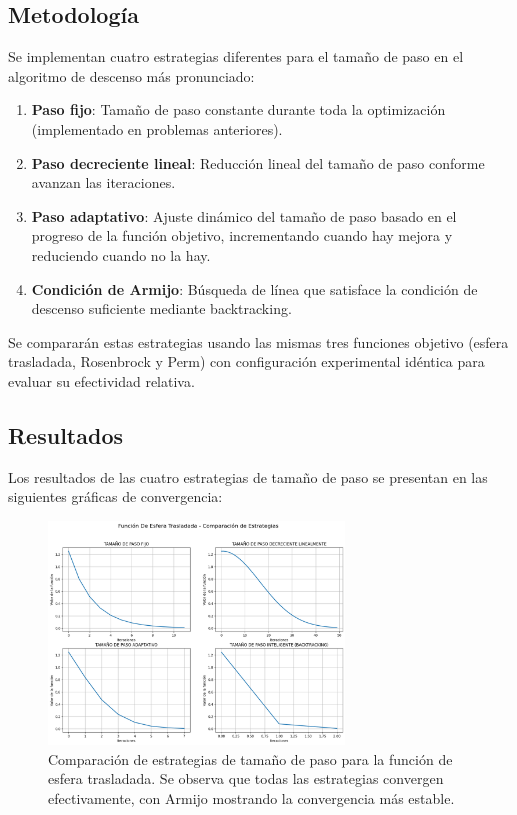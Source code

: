 \documentclass{article}
\begin{document}
\subsection{Metodología}

Se implementan cuatro estrategias diferentes para el tamaño de paso en el algoritmo de descenso más pronunciado:

\begin{enumerate}
    \item \textbf{Paso fijo}: Tamaño de paso constante durante toda la optimización (implementado en problemas anteriores).
    
    \item \textbf{Paso decreciente lineal}: Reducción lineal del tamaño de paso conforme avanzan las iteraciones.
    
    \item \textbf{Paso adaptativo}: Ajuste dinámico del tamaño de paso basado en el progreso de la función objetivo, incrementando cuando hay mejora y reduciendo cuando no la hay.
    
    \item \textbf{Condición de Armijo}: Búsqueda de línea que satisface la condición de descenso suficiente mediante backtracking.
\end{enumerate}

Se compararán estas estrategias usando las mismas tres funciones objetivo (esfera trasladada, Rosenbrock y Perm) con configuración experimental idéntica para evaluar su efectividad relativa.


\subsection{Resultados}
\setcounter{equation}{0}

Los resultados de las cuatro estrategias de tamaño de paso se presentan en las siguientes gráficas de convergencia:

\begin{figure}[H]
\centering
\includegraphics[width=0.7\textwidth]{images/8_sphere.png}
\caption{Comparación de estrategias de tamaño de paso para la función de esfera trasladada. Se observa que todas las estrategias convergen efectivamente, con Armijo mostrando la convergencia más estable.}
\label{fig:step_strategies_sphere}
\end{figure}
\end{document}
